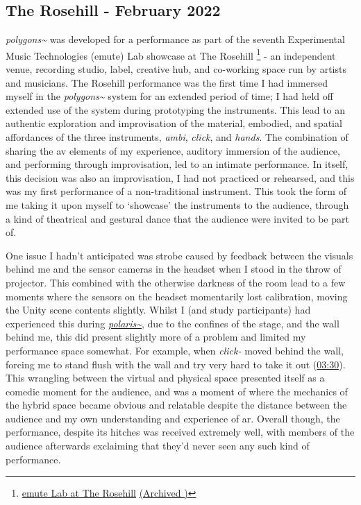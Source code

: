 \subsection{The Rosehill - February 2022}\label{sec: polygons-performances-rosehill}
\textit{polygons\textasciitilde{}} was developed for a performance as part of the seventh Experimental Music Technologies (emute) Lab showcase at The Rosehill \footnote{\href{https://www.emutelab.org/blog/emutelab6-copy}{emute Lab at The Rosehill} \href{https://archive.today/ysQZq}{(Archived \faArchive)}} - an independent venue, recording studio, label, creative hub, and co-working space run by artists and musicians. The Rosehill performance was the first time I had immersed myself in the \textit{polygons\textasciitilde{}} system for an extended period of time; I had held off extended use of the system during prototyping the instruments. This lead to an authentic exploration and improvisation of the material, embodied, and spatial affordances of the three instruments, \textit{ambi}, \textit{click}, and \textit{hands}. The combination of sharing the \gls{av} elements of my experience, auditory immersion of the audience, and performing through improvisation, led to an intimate performance. In itself, this decision was also an improvisation, I had not practiced or rehearsed, and this was my first performance of a non-traditional instrument. This took the form of me taking it upon myself to `showcase' the instruments to the audience, through a kind of theatrical and gestural dance that the audience were invited to be part of. 

One issue I hadn't anticipated was strobe caused by feedback between the visuals behind me and the sensor cameras in the headset when I stood in the throw of projector. This combined with the otherwise darkness of the room lead to a few moments where the sensors on the headset momentarily lost calibration, moving the Unity scene contents slightly. Whilst I (and study participants) had experienced this during \hyperref[sec: polaris-feedback-adoption-alignment]{\textit{polaris\textasciitilde{}}}, due to the confines of the stage, and the wall behind me, this did present slightly more of a problem and limited my performance space somewhat. For example, when \textit{click-} moved behind the wall, forcing me to stand flush with the wall and try very hard to take it out (\href{https://youtu.be/9IErsDvhXjM?t=210}{03:30}). This wrangling between the virtual and physical space presented itself as a comedic moment for the audience, and was a moment of where the mechanics of the hybrid space became obvious and relatable despite the distance between the audience and my own understanding and experience of \gls{ar}. Overall though, the performance, despite its hitches was received extremely well, with members of the audience afterwards exclaiming that they'd never seen any such kind of performance. 

